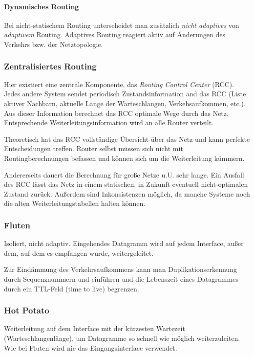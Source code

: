 \documentclass[a4paper, 14pt]{article}
\begin{document}
	\paragraph{Dynamisches Routing}

	Bei nicht-statischem Routing unterscheidet man zusätzlich \emph{nicht adaptives} von \emph{adaptivem} Routing.
	Adaptives Routing reagiert aktiv auf Änderungen des Verkehrs bzw. der Netztopologie.

	\subsubsection{Zentralisiertes Routing}

	Hier existiert eine zentrale Komponente, das \emph{Routing Control Center} (RCC).
	Jedes andere System sendet periodisch Zustandsinformation and das RCC (Liste aktiver Nachbarn, aktuelle Länge der Warteschlangen, Verkehsaufkommen, etc.).
	Aus dieser Information berechnet das RCC optimale Wege durch das Netz.
	Entsprechende Weiterleitungsinformation wird an alle Router verteilt.

	Theoretisch hat das RCC vollständige Übersicht über das Netz und kann perfekte Entscheidungen treffen.
	Router selbst müssen sich nicht mit Routingberechnungen befassen und können sich um die Weiterleitung kümmern.

	Andererseits dauert die Berechnung für große Netze u.U. sehr lange.
	Ein Ausfall des RCC lässt das Netz in einem statischen, in Zukunft eventuell nicht-optimalen Zustand zurück.
	Außerdem sind Inkonsistenzen möglich, da manche Systeme noch die alten Weiterleitungstabellen halten können.

	\subsubsection{Fluten}

	Isoliert, nicht adaptiv.
	Eingehendes Datagramm wird auf jedem Interface, außer dem, auf dem es empfangen wurde, weitergeleitet.

	Zur Eindämmung des Verkehrsaufkommens kann man Duplikationserkennung durch Sequenznummern und einführen und die Lebenszeit eines Datagrammes durch ein TTL-Feld (time to live) begrenzen.

	\subsubsection{Hot Potato}

	Weiterleitung auf dem Interface mit der kürzesten Wartezeit (Warteschlangenlänge), um Datagramme so schnell wie möglich weiterzuleiten.
	Wie bei Fluten wird nie das Eingangsinterface verwendet.
\end{document}
